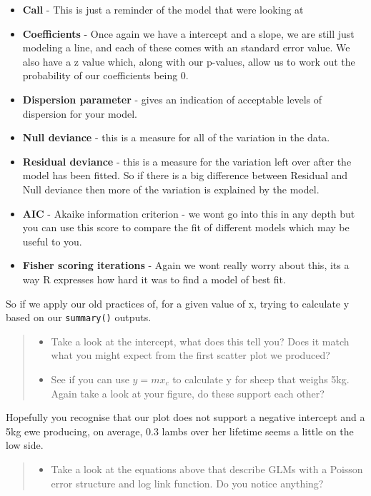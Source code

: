 \documentclass[
]{book}
\providecommand{\tightlist}{%
  \setlength{\itemsep}{0pt}\setlength{\parskip}{0pt}}
\begin{document}
\begin{itemize}
\tightlist
\item
  \textbf{Call} - This is just a reminder of the model that were looking at
\item
  \textbf{Coefficients} - Once again we have a intercept and a slope, we are still just modeling a line, and each of these comes with an standard error value. We also have a z value which, along with our p-values, allow us to work out the probability of our coefficients being 0.
\item
  \textbf{Dispersion parameter} - gives an indication of acceptable levels of dispersion for your model.
\item
  \textbf{Null deviance} - this is a measure for all of the variation in the data.
\item
  \textbf{Residual deviance} - this is a measure for the variation left over after the model has been fitted. So if there is a big difference between Residual and Null deviance then more of the variation is explained by the model.
\item
  \textbf{AIC} - Akaike information criterion - we wont go into this in any depth but you can use this score to compare the fit of different models which may be useful to you.
\item
  \textbf{Fisher scoring iterations} - Again we wont really worry about this, its a way R expresses how hard it was to find a model of best fit.
\end{itemize}

So if we apply our old practices of, for a given value of x, trying to calculate y based on our \texttt{summary()} outputs.

\begin{quote}
\begin{itemize}
\tightlist
\item
  Take a look at the intercept, what does this tell you? Does it match what you might expect from the first scatter plot we produced?
\item
  See if you can use \(y=mx_c\) to calculate y for sheep that weighs 5kg. Again take a look at your figure, do these support each other?
\end{itemize}
\end{quote}

Hopefully you recognise that our plot does not support a negative intercept and a 5kg ewe producing, on average, 0.3 lambs over her lifetime seems a little on the low side.

\begin{quote}
\begin{itemize}
\tightlist
\item
  Take a look at the equations above that describe GLMs with a Poisson error structure and log link function. Do you notice anything?
\end{itemize}
\end{quote}
\end{document}
